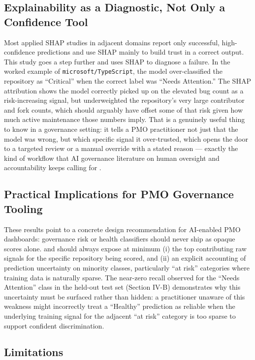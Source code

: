 \documentclass[conference]{IEEEtran}
\begin{document}
\subsection{Explainability as a Diagnostic, Not Only a Confidence Tool}

Most applied SHAP studies in adjacent domains \cite{ref10,ref11,ref12,ref13} report only
successful, high-confidence predictions and use SHAP mainly to build trust in a correct
output. This study goes a step further and uses SHAP to diagnose a failure. In the
worked example of \texttt{microsoft/TypeScript}, the model over-classified the repository
as ``Critical'' when the correct label was ``Needs Attention.'' The SHAP attribution
shows the model correctly picked up on the elevated bug count as a risk-increasing
signal, but underweighted the repository's very large contributor and fork counts, which
should arguably have offset some of that risk given how much active maintenance those
numbers imply. That is a genuinely useful thing to know in a governance setting: it
tells a PMO practitioner not just that the model was wrong, but which specific signal it
over-trusted, which opens the door to a targeted review or a manual override with a
stated reason --- exactly the kind of workflow that AI governance literature on human
oversight and accountability keeps calling for \cite{ref1,ref2}.

\subsection{Practical Implications for PMO Governance Tooling}

These results point to a concrete design recommendation for AI-enabled PMO dashboards:
governance risk or health classifiers should never ship as opaque scores alone.
and should always expose at minimum (i) the top contributing raw signals for the specific
repository being scored, and (ii) an explicit accounting of prediction uncertainty on
minority classes, particularly ``at risk'' categories where training data is naturally
sparse. The near-zero recall observed for the ``Needs Attention'' class in the held-out
test set (Section IV-B) demonstrates why this uncertainty must be surfaced rather than
hidden: a practitioner unaware of this weakness might incorrectly treat a ``Healthy''
prediction as reliable when the underlying training signal for the adjacent ``at risk''
category is too sparse to support confident discrimination.

\subsection{Limitations}
\end{document}
